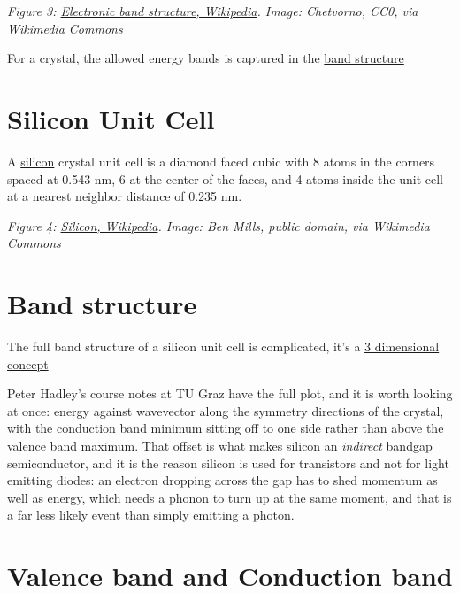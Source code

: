 \emph{Figure 3:
\href{https://en.wikipedia.org/wiki/Electronic_band_structure}{Electronic
band structure, Wikipedia}. Image: Chetvorno, CC0, via Wikimedia
Commons}

For a crystal, the allowed energy bands is captured in the
\href{https://en.wikipedia.org/wiki/Electronic_band_structure}{band
structure}

\section{Silicon Unit Cell}\label{silicon-unit-cell}

A \href{https://en.wikipedia.org/wiki/Silicon}{silicon} crystal unit
cell is a diamond faced cubic with 8 atoms in the corners spaced at
0.543 nm, 6 at the center of the faces, and 4 atoms inside the unit cell
at a nearest neighbor distance of 0.235 nm.


{
\centering
{}
}

\emph{Figure 4: \href{https://en.wikipedia.org/wiki/Silicon}{Silicon,
Wikipedia}. Image: Ben Mills, public domain, via Wikimedia Commons}

\section{Band structure}\label{band-structure}

The full band structure of a silicon unit cell is complicated, it's a
\href{http://lampx.tugraz.at/~hadley/ss1/semiconductors/silicon_bandstructure.php}{3
dimensional concept}

Peter Hadley's course notes at TU Graz have the full plot, and it is
worth looking at once: energy against wavevector along the symmetry
directions of the crystal, with the conduction band minimum sitting off
to one side rather than above the valence band maximum. That offset is
what makes silicon an \emph{indirect} bandgap semiconductor, and it is
the reason silicon is used for transistors and not for light emitting
diodes: an electron dropping across the gap has to shed momentum as well
as energy, which needs a phonon to turn up at the same moment, and that
is a far less likely event than simply emitting a photon.

\section{Valence band and Conduction
band}\label{valence-band-and-conduction-band}

